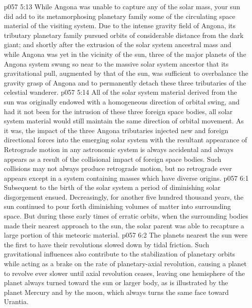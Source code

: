 \pc \vs p057 5:13 While Angona was unable to capture any of the solar mass, your sun did add to its metamorphosing planetary family some of the circulating space material of the visiting system. Due to the intense gravity field of Angona, its tributary planetary family pursued orbits of considerable distance from the dark giant; and shortly after the extrusion of the solar system ancestral mass and while Angona was yet in the vicinity of the sun, three of the major planets of the Angona system swung so near to the massive solar system ancestor that its gravitational pull, augmented by that of the sun, was sufficient to overbalance the gravity grasp of Angona and to permanently detach these three tributaries of the celestial wanderer.
\vs p057 5:14 All of the solar system material derived from the sun was originally endowed with a homogeneous direction of orbital swing, and had it not been for the intrusion of these three foreign space bodies, all solar system material would still maintain the same direction of orbital movement. As it was, the impact of the three Angona tributaries injected new and foreign directional forces into the emerging solar system with the resultant appearance of  Retrograde motion in any astronomic system is always accidental and always appears as a result of the collisional impact of foreign space bodies. Such collisions may not always produce retrograde motion, but no retrograde ever appears except in a system containing masses which have diverse origins.
\vs p057 6:1 Subsequent to the birth of the solar system a period of diminishing solar disgorgement ensued. Decreasingly, for another five hundred thousand years, the sun continued to pour forth diminishing volumes of matter into surrounding space. But during these early times of erratic orbits, when the surrounding bodies made their nearest approach to the sun, the solar parent was able to recapture a large portion of this meteoric material.
\pc \vs p057 6:2 The planets nearest the sun were the first to have their revolutions slowed down by tidal friction. Such gravitational influences also contribute to the stabilization of planetary orbits while acting as a brake on the rate of planetary\hyp{}axial revolution, causing a planet to revolve ever slower until axial revolution ceases, leaving one hemisphere of the planet always turned toward the sun or larger body, as is illustrated by the planet Mercury and by the moon, which always turns the same face toward Urantia.
